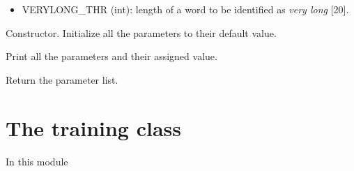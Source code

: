 \documentclass[letterpaper,10pt,english]{sphinxmanual}
\begin{document}
\begin{fulllineitems}
\begin{itemize}
\item {} 
VERYLONG\_THR (int): length of a word to be identified as \emph{very long} {[}20{]}.

\end{itemize}

\begin{fulllineitems}
\label{index:config.Config.__init__}
Constructor. Initialize all the parameters to their default value.

\end{fulllineitems}


\begin{fulllineitems}
\label{index:config.Config.cprint}
Print all the parameters and their assigned value.

\end{fulllineitems}


\begin{fulllineitems}
\label{index:config.Config.get_params}
Return the parameter list.

\end{fulllineitems}


\end{fulllineitems}



\section{The training class}
\label{index:the-training-class}
In this module
\label{index:module-trainer}
\end{document}
